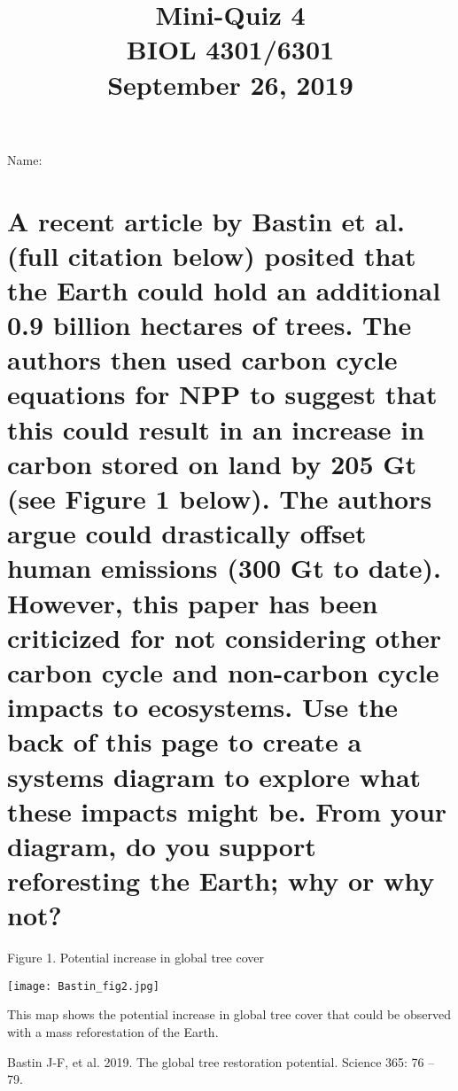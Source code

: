 \documentclass[12pt, notitlepage]{article}   	%
\title{
	\textbf{
		Mini-Quiz 4
	} \\
	\large BIOL 4301/6301 \\
	\large September 26, 2019 \\
}
\date{\vspace{-5ex}}
\begin{document}
{\selectfont %

\large{Name:}

{\let\newpage\relax\maketitle}

\section{\small{A recent article by Bastin et al. (full citation below) posited that
the Earth could hold an additional 0.9 billion hectares of trees. The authors
then used carbon cycle equations for NPP to suggest that this could result in an increase
in carbon stored on land by 205 Gt (see Figure 1 below). 
The authors argue could drastically offset human emissions (300 Gt to date). However, this
paper has been criticized for not considering other carbon cycle and non-carbon cycle
impacts to ecosystems. Use the back of this page to create a systems diagram 
to explore what these impacts might be. From your diagram,
do you support reforesting the Earth; why or why not?}}

\small{Figure 1. Potential increase in global tree cover}

\texttt{[image: Bastin\_fig2.jpg]}

\small{This map shows the potential increase in global tree cover that could be observed with a
mass reforestation of the Earth.}

\small{Bastin J-F, et al. 2019. The global tree restoration potential. Science 365: 76 – 79.}


} %
\end{document}
